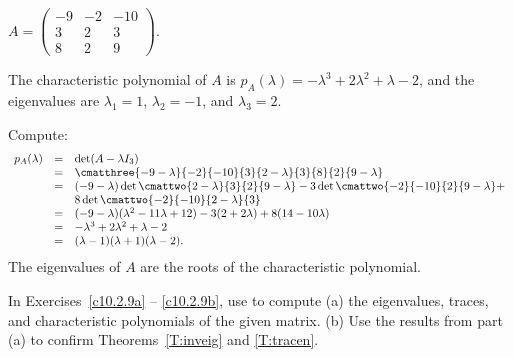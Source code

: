 \documentclass{article}
\begin{document}
\begin{exercise} \label{c10.2.1a}
$A = \left(\begin{array}{rrr} -9 & -2 & -10 \\ 3 & 2 & 3 \\
8 & 2 & 9 \end{array}\right)$. 

\begin{solution}

\ans The characteristic polynomial of $A$ is $p_A(\lambda) =
-\lambda^3 + 2\lambda^2 + \lambda - 2$, and the eigenvalues are
$\lambda_1 = 1$, $\lambda_2 = -1$, and $\lambda_3 = 2$.

\soln Compute:
\[
\begin{array}{rcl}
p_A(\lambda) & = & \det(A - \lambda I_3) \\
& = & \cmatthree{-9 - \lambda}{-2}{-10}{3}{2 - \lambda}{3}
{8}{2}{9 - \lambda} \\
& = & (-9 - \lambda)\det\cmattwo{2 - \lambda}{3}{2}{9 - \lambda}
- 3\det\cmattwo{-2}{-10}{2}{9 - \lambda} + \\
& & 8\det\cmattwo{-2}{-10}{2 - \lambda}{3} \\
& = & (-9 - \lambda)(\lambda^2 - 11\lambda + 12)
- 3(2 + 2\lambda) + 8(14 - 10\lambda) \\
& = & -\lambda^3 + 2\lambda^2 + \lambda - 2 \\
& = & (\lambda - 1)(\lambda + 1)(\lambda - 2). \end{array}
\]
The eigenvalues of $A$ are the roots of the characteristic polynomial.

\end{solution}
\end{exercise}





\matlabproblemlabel

\noindent In Exercises~\ref{c10.2.9a} -- \ref{c10.2.9b}, use \Matlab to 
compute (a) the eigenvalues, traces, and characteristic polynomials of 
the given matrix.  (b) Use the results from part (a) to confirm 
Theorems~\ref{T:inveig} and \ref{T:tracen}.
\end{document}
